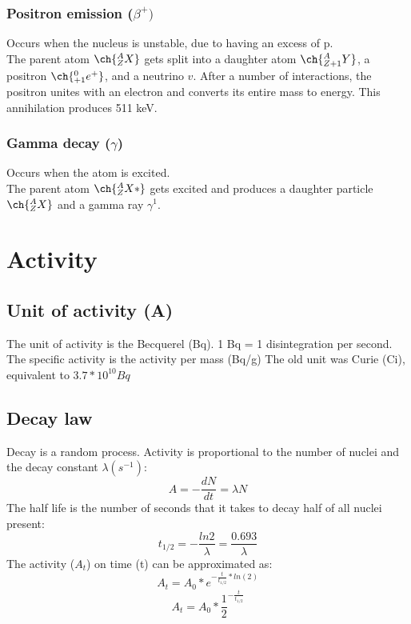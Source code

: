 \subsubsection{Positron emission ($\beta^{+})$}
Occurs when the nucleus is unstable, due to having an excess of p.\\
The parent atom $\ch{^{A}_{Z}X}$ gets split into a daughter atom $\ch{^{A}_{Z+1}Y}$, a positron $\ch{^{0}_{+1}e^{+}}$, and a neutrino $v$.
After a number of interactions, the positron unites with an electron and converts its entire mass to energy. This annihilation produces 511 keV.
\subsubsection{Gamma decay ($\gamma$)}
Occurs when the atom is excited.\\
The parent atom $\ch{^{A}_{Z}X*}$ gets excited and produces a daughter particle $\ch{^{A}_{Z}X}$ and a gamma ray $\gamma^{1}$.
\section{Activity}
\subsection{Unit of activity (A)}
The unit of activity is the Becquerel (Bq). 1 Bq = 1 disintegration per second.
The specific activity is the activity per mass (Bq/g)
The old unit was Curie (Ci), equivalent to $3.7*10^{10}Bq$
 \subsection{Decay law}
 Decay is a random process. 
Activity is proportional to the number of nuclei and the decay constant $\lambda (s^{-1})$:
\[ A = -\frac{dN}{dt} = \lambda N \]
The half life is the number of seconds that it takes to decay half of all nuclei present:
\[ t_{1/2} = -\frac{ln2}{\lambda} = \frac{0.693}{\lambda} \]
The activity ($A_t$) on time (t) can be approximated as:
\[ A_{t} = A_0 * e^{-\frac{t}{t_{1/2}}*ln(2)} \]
\[ A_{t} = A_0 * \frac{1}{2}^{-\frac{t}{t_{1/2}}} \]
